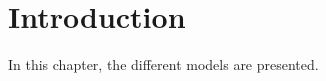 \documentclass[../../main.tex]{subfiles}
\begin{document}
\section{Introduction}\label{sec:Intro}
In this chapter, the different models are presented.
\end{document}
